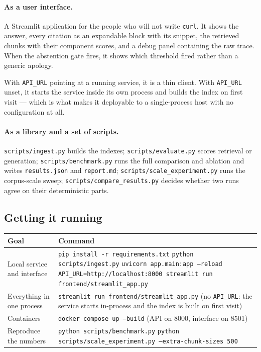\documentclass[11pt,a4paper]{article}
\newcommand{\code}[1]{\texttt{\small #1}}
\begin{document}
\paragraph{As a user interface.} A Streamlit application for the people who will
not write \code{curl}. It shows the answer, every citation as an expandable block
with its snippet, the retrieved chunks with their component scores, and a debug
panel containing the raw trace. When the abstention gate fires, it shows which
threshold fired rather than a generic apology.

With \code{API\_URL} pointing at a running service, it is a thin client. With
\code{API\_URL} unset, it starts the service inside its own process and builds the
index on first visit --- which is what makes it deployable to a single-process
host with no configuration at all.

\paragraph{As a library and a set of scripts.} \code{scripts/ingest.py} builds
the indexes; \code{scripts/evaluate.py} scores retrieval or generation;
\code{scripts/benchmark.py} runs the full comparison and ablation and writes
\code{results.json} and \code{report.md}; \code{scripts/scale\_experiment.py} runs
the corpus-scale sweep; \code{scripts/compare\_results.py} decides whether two
runs agree on their deterministic parts.

\subsection{Getting it running}

\begin{center}
\small
\begin{tabular}{@{}p{5.4cm}p{9.6cm}@{}}
\toprule
\textbf{Goal} & \textbf{Command} \\
\midrule
Local service and interface &
\code{pip install -r requirements.txt}\newline
\code{python scripts/ingest.py}\newline
\code{uvicorn app.main:app --reload}\newline
\code{API\_URL=http://localhost:8000 streamlit run frontend/streamlit\_app.py} \\
\addlinespace
Everything in one process &
\code{streamlit run frontend/streamlit\_app.py} \newline (no \code{API\_URL}: the
service starts in-process and the index is built on first visit) \\
\addlinespace
Containers &
\code{docker compose up --build} \newline (API on 8000, interface on 8501) \\
\addlinespace
Reproduce the numbers &
\code{python scripts/benchmark.py} \newline
\code{python scripts/scale\_experiment.py --extra-chunk-sizes 500} \\
\bottomrule
\end{tabular}
\end{center}
\end{document}
